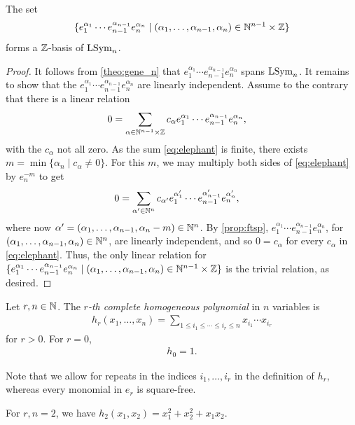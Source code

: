 \documentclass[11pt]{amsart}
\begin{document}
\begin{cor} \label{cor:FTLSP}
    The set 
    \begin{align}
        \{e_1^{\alpha_1} \cdots e_{n - 1}^{\alpha_{n - 1}} e_n^{\alpha_n} \mid (\alpha_1,\dots,\alpha_{n -1},\alpha_n) \in \mathbb{N}^{n -1} \times \mathbb{Z} \} \label{eq:elt-basis}
    \end{align} forms a $\mathbb{Z}$-basis of \(\mathrm{LSym}_n\).
\end{cor}
\begin{proof}
        It follows from \cref{theo:gene_n} that \(e_1^{\alpha_1} \cdots e_{n - 1}^{\alpha_{n - 1}} e_n^{\alpha_n}\) spans \(\mathrm{LSym}_n\). It remains to show that the \(e_1^{\alpha_1} \cdots e_{n - 1}^{\alpha_{n - 1}} e_n^{\alpha_n}\) are linearly independent. Assume to the contrary that there is a linear relation 
        \begin{align}
            0&=\sum_{\alpha \in \mathbb{N}^{n -1} \times \mathbb{Z}} c_\alpha e_1^{\alpha_1} \cdots e_{n-1}^{\alpha_{n-1}}e_n^{\alpha_n}, \label{eq:elephant}
        \end{align}
        with the $c_\alpha$ not all zero. As the sum \cref{eq:elephant} is finite, there exists $m = \min\{\alpha_n \mid c_\alpha \neq 0\}$. 
        For this \(m\), we may multiply both sides of \cref{eq:elephant} by $e_n^{-m}$ to get
        \begin{align}
            0&=\sum_{\alpha' \in \mathbb{N}^{n}} c_{\alpha'} e_1^{\alpha'_1} \cdots e_{n-1}^{\alpha'_{n-1}}e_n^{\alpha_n'},
        \end{align}
        where now $\alpha' = (\alpha_1,\dots,\alpha_{n-1}, \alpha_{n} - m) \in \mathbb{N}^n$.
        By \cref{prop:ftsp},  \(e_1^{\alpha_1} \cdots e_{n - 1}^{\alpha_{n - 1}} e_n^{\alpha_n}\), for \((\alpha_1,\dots,\alpha_{n -1},\alpha_n) \in \mathbb{N}^{n}\), are linearly independent, and so $0=c_\alpha$ for every $c_\alpha$ in \cref{eq:elephant}.
        Thus, the only linear relation for \(\{e_1^{\alpha_1} \cdots e_{n - 1}^{\alpha_{n - 1}} e_n^{\alpha_n} \mid (\alpha_1,\dots,\alpha_{n -1},\alpha_n) \in \mathbb{N}^{n -1} \times \mathbb{Z}\}\) is the trivial relation, as desired.
\end{proof}

\begin{defin}
     Let $r, n \in \mathbb{N}$. The \emph{$r$-th complete homogeneous polynomial} in $n$ variables is 
     \begin{align}
         h_r(x_1, \dots, x_n)=\sum_{1\leq i_1 \leq \cdots \leq i_r\leq n} x_{i_1}\cdots x_{i_r}
     \end{align}
     for $r>0$. For $r=0$, 
     \begin{align}
         h_0 = 1.
     \end{align}
\end{defin}
Note that we allow for repeats in the indices $i_1, \dots, i_r$ in the definition of $h_r$, whereas every monomial in $e_r$ is square-free.
\begin{eg}
    For $r,n=2$, we have $h_2(x_1, x_2)=x_1^2+x_2^2+x_1x_2$. 
\end{eg}
\end{document}
